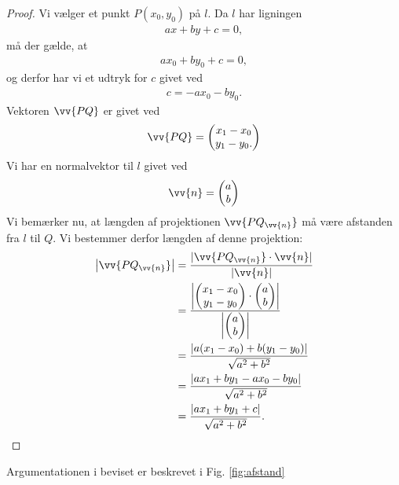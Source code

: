 \begin{proof}
Vi vælger et punkt  $P(x_0,y_0)$ på $l$. Da $l$ har ligningen
\begin{align*}
ax+by+c = 0, 
\end{align*}
må der gælde, at 
\begin{align*}
ax_0+by_0+c = 0, 
\end{align*}
og derfor har vi et udtryk for $c$ givet ved
\begin{align*}
c = -ax_0-by_0.
\end{align*}
Vektoren $\vv{PQ}$ er givet ved
\begin{align*}
\vv{PQ} = \begin{pmatrix}
x_1 - x_0 \\ y_1 - y_0.
\end{pmatrix}
\end{align*}
Vi har en normalvektor til $l$ givet ved 
\begin{align*}
\vv{n}=
\begin{pmatrix}
a \\ b
\end{pmatrix}
\end{align*}
Vi bemærker nu, at længden af projektionen $\vv{PQ_{\vv{n}}}$ må være afstanden fra $l$ til $Q$. Vi bestemmer derfor længden af denne projektion:
\begin{align*}
\left|\vv{PQ_{\vv{n}}}\right| &= \frac{|\vv{PQ_{\vv{n}}}\cdot \vv{n}|}{|\vv{n}|} \\ 
&= \frac{\left|\begin{pmatrix}
x_1-x_0 \\ y_1 - y_0
\end{pmatrix}\cdot \begin{pmatrix}
a \\ b
\end{pmatrix} \right|}{\left|\begin{pmatrix}
a \\ b
\end{pmatrix}\right|}\\
&=\frac{|a(x_1-x_0)+b(y_1-y_0)|}{\sqrt{a^2+b^2}}\\
&= \frac{|ax_1+by_1 -ax_0-by_0|}{\sqrt{a^2+b^2}}\\
&= \frac{|ax_1+by_1+c|}{\sqrt{a^2+b^2}}.
\end{align*}
\end{proof}
Argumentationen i beviset er beskrevet i Fig. \ref{fig:afstand}
